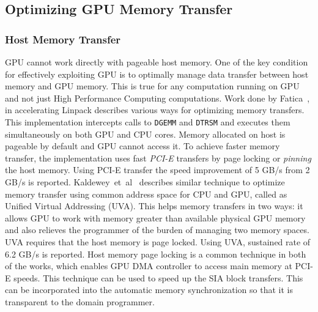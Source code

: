 \subsection{Optimizing GPU Memory Transfer}
\subsubsection{Host Memory Transfer}
GPU cannot work directly with pageable host memory. One of the key condition for
effectively exploiting GPU is to optimally manage data transfer between host memory
and GPU memory. This is true for any computation running on GPU and not just High
Performance Computing computations. Work done by Fatica~\cite{Fatica:2009:ALC:1513895.1513901},
in accelerating Linpack describes various ways for optimizing memory transfers. This
implementation intercepts calls to \texttt{DGEMM} and \texttt{DTRSM} and executes them simultaneously
on both GPU and CPU cores. Memory allocated on host is pageable by default and GPU
cannot access it. To achieve faster memory transfer, the implementation uses fast
\textit{PCI-E} transfers by page locking or \textit{pinning} the host memory. Using
PCI-E transfer the speed improvement of 5 GB/s from 2 GB/s is reported.
Kaldewey~et~al~\cite{Kaldewey:2012:GJP:2236584.2236592} describes similar technique
to optimize memory transfer using common address space for CPU and GPU, called as
Unified Virtual Addressing (UVA). This helps memory transfers in two ways: it
allows GPU to work with memory greater than available physical GPU memory and also relieves
the programmer of the burden of managing two memory spaces. UVA requires that the
host memory is page locked. Using UVA, sustained rate of 6.2 GB/s is reported.
Host memory page locking is a common technique in both of the works, which enables GPU DMA controller
to access main memory at PCI-E speeds. This technique can be used to speed up the
SIA block transfers. This can be incorporated into the automatic memory synchronization
so that it is transparent to the domain programmer.

